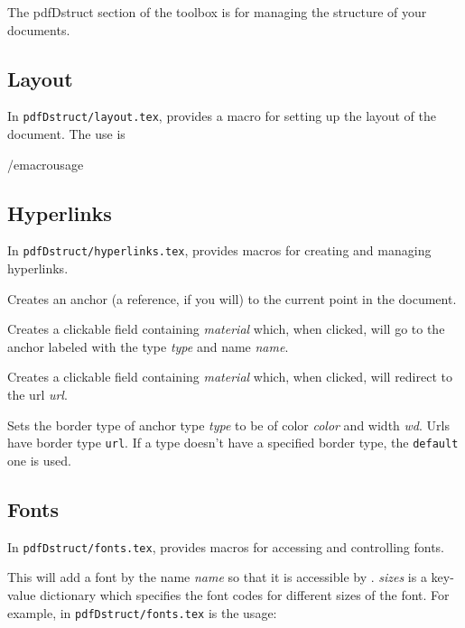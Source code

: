 The pdfDstruct section of the \pdftoolbox{} toolbox is for managing the structure of your documents.

\subsection{Layout}

In {\tt pdfDstruct/layout.tex}, \pdftoolbox{} provides a macro \macro\setlayout\anchormacro\setlayout{} for setting up the layout of the document.
The use is

\macrousage\setlayout {[page width=<wd>,] [page height=<ht>,] [horizontal margin=<mwd>,]
[vertical margin=<vwd>]}/emacrousage

\subsection{Hyperlinks}

In {\tt pdfDstruct/hyperlinks.tex}, \pdftoolbox{} provides macros for creating and managing hyperlinks.

Creates an anchor (a reference, if you will) to the current point in the document.
\emacroexp

Creates a clickable field containing {\it material} which, when clicked, will go to the anchor labeled with the type {\it type} and name {\it name}.
\emacroexp

Creates a clickable field containing {\it material} which, when clicked, will redirect to the url {\it url}.
\emacroexp

Sets the border type of anchor type {\it type} to be of color {\it color} and width {\it wd}.
Urls have border type {\tt url}.
If a type doesn't have a specified border type, the {\tt default} one is used.
\emacroexp

\subsection{Fonts}

In {\tt pdfDstruct/fonts.tex}, \pdftoolbox{} provides macros for accessing and controlling fonts.

This will add a font by the name {\it name} so that it is accessible by \pdftoolbox.
{\it sizes} is a key-value dictionary which specifies the font codes for different sizes of the font.
For example, in {\tt pdfDstruct/fonts.tex} is the usage:

